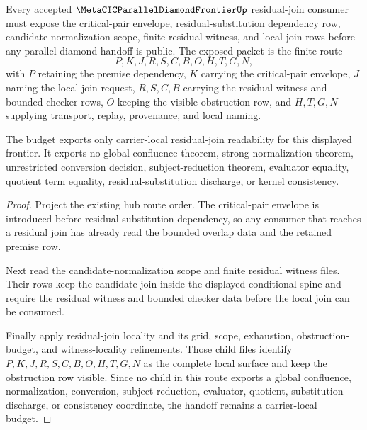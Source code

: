\begin{theorem}
\label{thm:metacic-parallel-diamond-residual-join-locality-budget}
Every accepted $\MetaCICParallelDiamondFrontierUp$ residual-join consumer must expose the critical-pair envelope, residual-substitution dependency row, candidate-normalization scope, finite residual witness, and local join rows before any parallel-diamond handoff is public. The exposed packet is the finite route
$$
P,K,J,R,S,C,B,O,H,T,G,N ,
$$
with $P$ retaining the premise dependency, $K$ carrying the critical-pair envelope, $J$ naming the local join request, $R,S,C,B$ carrying the residual witness and bounded checker rows, $O$ keeping the visible obstruction row, and $H,T,G,N$ supplying transport, replay, provenance, and local naming.

The budget exports only carrier-local residual-join readability for this displayed frontier. It exports no global confluence theorem, strong-normalization theorem, unrestricted conversion decision, subject-reduction theorem, evaluator equality, quotient term equality, residual-substitution discharge, or kernel consistency.
\end{theorem}
\begin{proof}
Project the existing hub route order. The critical-pair envelope is introduced before residual-substitution dependency, so any consumer that reaches a residual join has already read the bounded overlap data and the retained premise row.

Next read the candidate-normalization scope and finite residual witness files. Their rows keep the candidate join inside the displayed conditional spine and require the residual witness and bounded checker data before the local join can be consumed.

Finally apply residual-join locality and its grid, scope, exhaustion, obstruction-budget, and witness-locality refinements. Those child files identify $P,K,J,R,S,C,B,O,H,T,G,N$ as the complete local surface and keep the obstruction row visible. Since no child in this route exports a global confluence, normalization, conversion, subject-reduction, evaluator, quotient, substitution-discharge, or consistency coordinate, the handoff remains a carrier-local budget.
\end{proof}

